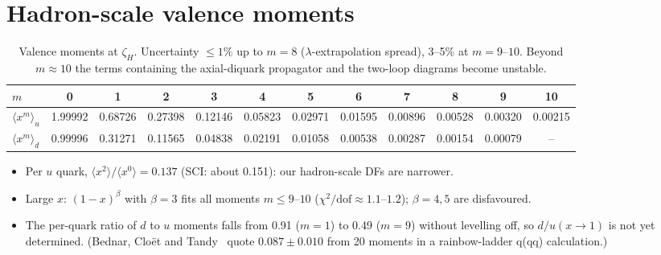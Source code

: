 \documentclass[11pt,a4paper]{article}
\newcommand{\zH}{\zeta_H}
\newcommand{\mom}[1]{\langle #1\rangle}
\begin{document}
\section{Hadron-scale valence moments}
\begin{table}[H]
\centering\footnotesize
\setlength{\tabcolsep}{3.5pt}
\begin{tabular}{l*{11}{c}}
\toprule
$m$ & 0 & 1 & 2 & 3 & 4 & 5 & 6 & 7 & 8 & 9 & 10\\
\midrule
$\mom{x^m}_u$ & 1.99992 & 0.68726 & 0.27398 & 0.12146 & 0.05823 & 0.02971 & 0.01595 & 0.00896 & 0.00528 & 0.00320 & 0.00215\\
$\mom{x^m}_d$ & 0.99996 & 0.31271 & 0.11565 & 0.04838 & 0.02191 & 0.01058 & 0.00538 & 0.00287 & 0.00154 & 0.00079 & --\\
\bottomrule
\end{tabular}
\caption{Valence moments at $\zH$. Uncertainty $\le 1\%$ up to $m = 8$ ($\lambda$-extrapolation spread),
3--5\% at $m = 9$--$10$. Beyond $m \approx 10$ the terms containing the axial-diquark propagator and the two-loop
diagrams become unstable.}
\end{table}

\begin{itemize}
\item Per $u$ quark, $\mom{x^2}/\mom{x^0} = 0.137$ (SCI: about 0.151): our hadron-scale DFs are narrower.
\item Large $x$: $(1-x)^\beta$ with $\beta = 3$ fits all moments $m \le 9$--$10$ ($\chi^2/\text{dof} \approx 1.1$--$1.2$);
  $\beta = 4, 5$ are disfavoured.
\item The per-quark ratio of $d$ to $u$ moments falls from 0.91 ($m = 1$) to 0.49 ($m = 9$) without levelling off, so
  $d/u(x\to1)$ is not yet determined. (Bednar, Clo\"et and Tandy~\cite{Bednar:2018mtf} quote $0.087\pm0.010$ from 20
  moments in a rainbow-ladder q(qq) calculation.)
\end{itemize}
\end{document}
